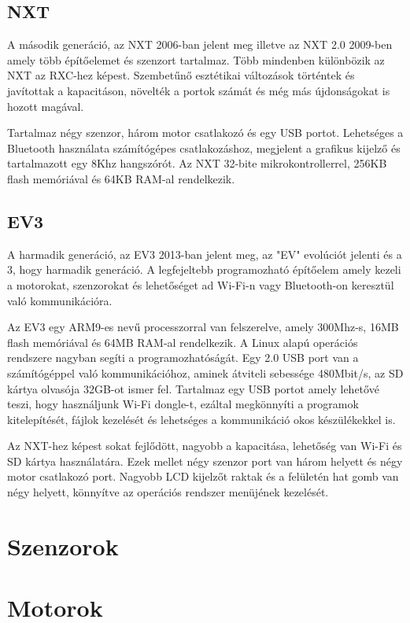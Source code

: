 \subsection{NXT}
A második generáció, az NXT 2006-ban jelent meg illetve az NXT 2.0 2009-ben amely több építőelemet és szenzort tartalmaz. Több mindenben különbözik az NXT az RXC-hez képest. Szembetűnő esztétikai változások történtek és javítottak a kapacitáson, növelték a portok számát és még más újdonságokat is hozott magával.

Tartalmaz négy szenzor, három motor csatlakozó és egy USB portot. Lehetséges a Bluetooth használata számítógépes csatlakozáshoz, megjelent a grafikus kijelző és tartalmazott egy 8Khz hangszórót. Az NXT 32-bite mikrokontrollerrel, 256KB flash memóriával és 64KB RAM-al rendelkezik.

\subsection{EV3}
A harmadik generáció, az EV3 2013-ban jelent meg, az "EV" evolúciót jelenti és a 3, hogy harmadik generáció. A legfejeltebb programozható építőelem amely kezeli a motorokat, szenzorokat és lehetőséget ad Wi-Fi-n vagy Bluetooth-on keresztül való kommunikációra.

Az EV3 egy ARM9-es nevű processzorral van felszerelve, amely 300Mhz-s, 16MB flash memóriával és 64MB RAM-al rendelkezik. A Linux alapú operációs rendszere nagyban segíti a programozhatóságát. Egy 2.0 USB port van a számítógéppel való kommunikációhoz, aminek átviteli sebessége 480Mbit/s, az SD kártya olvasója 32GB-ot ismer fel. Tartalmaz egy USB portot amely lehetővé teszi, hogy használjunk Wi-Fi dongle-t, ezáltal megkönnyíti a programok kitelepítését, fájlok kezelését és lehetséges a kommunikáció okos készülékekkel is.

Az NXT-hez képest sokat fejlődött, nagyobb a kapacitása, lehetőség van Wi-Fi és SD kártya használatára. Ezek mellet négy szenzor port van három helyett és négy motor csatlakozó port. Nagyobb LCD kijelzőt raktak és a felületén hat gomb van négy helyett, könnyítve az operációs rendszer menüjének kezelését.

\section{Szenzorok}\label{sec:ROBOT:szenzorok}
\section{Motorok}\label{sec:ROBOT:motorok}
